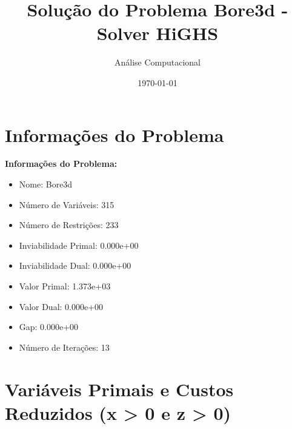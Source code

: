 \documentclass[12pt]{article}
\title{Solução do Problema Bore3d - Solver HiGHS}
\author{Análise Computacional}
\date{\today}
\begin{document}
\maketitle

\section{Informações do Problema}

\textbf{Informações do Problema:}
\begin{itemize}
\item Nome: Bore3d
\item Número de Variáveis: 315
\item Número de Restrições: 233
\item Inviabilidade Primal: 0.000e+00
\item Inviabilidade Dual: 0.000e+00
\item Valor Primal: 1.373e+03
\item Valor Dual: 0.000e+00
\item Gap: 0.000e+00
\item Número de Iterações: 13
\end{itemize}


\section{Variáveis Primais e Custos Reduzidos (x > 0 e z > 0)}
\end{document}
